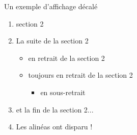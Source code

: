 \documentclass[11pt,aspectratio=169]{beamer}
\begin{document}
\begin{frame}{Un exemple d'affichage décalé}
\begin{enumerate}
\item<1-> section 2

\item<2-> La suite de la section 2

\begin{itemize}
\item<3> en retrait de la section 2
\item<3> toujours en retrait de la section 2
\begin{itemize}
	\item<3> en sous-retrait
\end{itemize}
\end{itemize}

\item<2-> et la fin de la section 2...
\item<4-> Les alinéas ont disparu !
\end{enumerate}

\end{frame}
\end{document}
